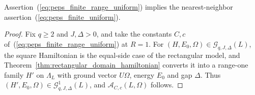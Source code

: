 \begin{theorem}
    \label{thm:peps_finite_range_implies_nearest_neighbor}
    \leanok
    Assertion~(\ref{eq:peps_finite_range_uniform}) implies the
    nearest-neighbor assertion~(\ref{eq:peps_finite_uniform}).
\end{theorem}
\begin{proof}
    \leanok
    Fix $q\ge2$ and $J,\Delta>0$, and take the constants $C,c$
    of~(\ref{eq:peps_finite_range_uniform}) at $R=1$. For
    $(H,E_0,\Omega)\in\mathcal G_{q,J,\Delta}(L)$, the square Hamiltonian is
    the equal-side case of the rectangular model, and
    Theorem~\ref{thm:rectangular_domain_hamiltonian} converts it into a
    range-one family $H'$ on $\Lambda_L$ with ground vector $U\Omega$, energy
    $E_0$ and gap $\Delta$. Thus
    $(H',E_0,\Omega)\in\mathcal G^{1}_{q,J,\Delta}(L)$, and
    $\mathcal A_{C,c}(L,\Omega)$ follows.
\end{proof}
